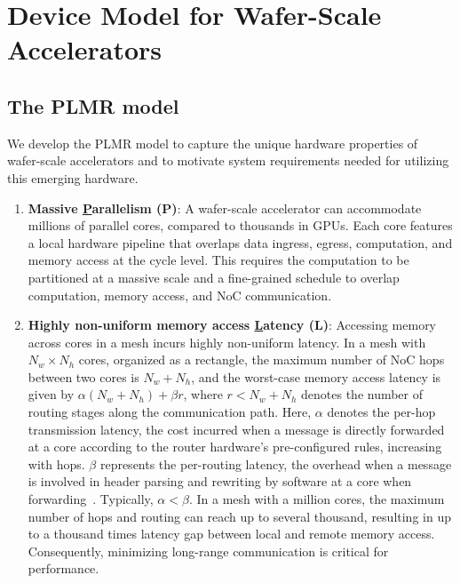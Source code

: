 \vspace{-0.3cm}
\section{Device Model for Wafer-Scale Accelerators}
\vspace{-0.2cm}

\subsection{The PLMR model}
\vspace{-0.1cm}
We develop the PLMR model to capture the unique hardware properties of wafer-scale accelerators and to motivate system requirements needed for utilizing this emerging hardware.

\begin{enumerate}[label=(\arabic*), leftmargin=0.5cm, noitemsep,topsep=0pt]
    \item \textbf{Massive \underline{P}arallelism (P)}:
A wafer-scale accelerator can accommodate millions of parallel cores, compared to thousands in GPUs. Each core features a local hardware pipeline that overlaps data ingress, egress, computation, and memory access at the cycle level.
This requires the computation to be partitioned at a massive scale and a fine-grained schedule to overlap computation, memory access, and NoC communication.

\item \textbf{Highly non-uniform memory access \underline{L}atency (L)}: Accessing memory across cores in a mesh incurs highly non-uniform latency. In a mesh with $N_w \times N_h$ cores, organized as a rectangle, the maximum number of NoC hops between two cores is $N_w + N_h$, and the worst-case memory access latency is given by $\alpha(N_w + N_h) + \beta r$, where $r < N_w + N_h$ denotes the number of routing stages along the communication path. Here, $\alpha$ denotes the per-hop transmission latency, the cost incurred when a message is directly forwarded at a core according to the router hardware's pre-configured rules, increasing with hops. $\beta$ represents the per-routing latency, the overhead when a message is involved in header parsing and rewriting by software at a core when forwarding~\cite{wafer-reduce}. Typically, $\alpha < \beta$. In a mesh with a million cores, the maximum number of hops and routing can reach up to several thousand, resulting in up to a thousand times latency gap between local and remote memory access. Consequently, minimizing long-range communication is critical for performance.


\end{enumerate}
